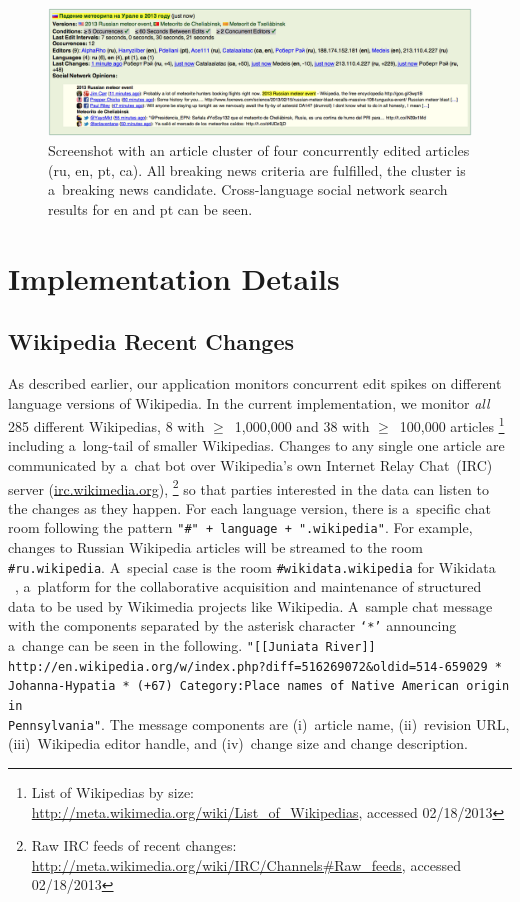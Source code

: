 \begin{figure}[!ht]
  \centering
  \includegraphics[width=\linewidth]{wikipedia-live-monitor.png}
  \caption[Screenshot with an article cluster of four concurrently edited articles]
    {Screenshot with an article cluster of four concurrently edited articles
    (ru, en, pt, ca). All breaking news criteria are fulfilled,
    the cluster is a~breaking news candidate.
    Cross-language social network search results for en and pt can be seen.}
  \label{fig:screenshotwikilivemon}
\end{figure}

\section{Implementation Details}

\subsection{Wikipedia Recent Changes}
\label{sec:wikipedia-recent-changes}

As described earlier, our application monitors concurrent edit spikes
on different language versions of Wikipedia.
In the current implementation, we monitor \emph{all}
285 different Wikipedias, 8 with 
$\geq$~1,000,000 and 38 with $\geq$~100,000 articles%
\footnote{List of Wikipedias by size: \url{http://meta.wikimedia.org/wiki/List_of_Wikipedias},
accessed 02/18/2013}
including a~long-tail of smaller Wikipedias.
Changes to any single one article are communicated by a~chat bot
over Wikipedia's own Internet Relay Chat~(IRC) server (\url{irc.wikimedia.org}),%
\footnote{Raw IRC feeds of recent changes: \url{http://meta.wikimedia.org/wiki/IRC/Channels\#Raw_feeds}, accessed 02/18/2013}
so that parties interested in the data can listen to the changes as they happen.
For each language version, there is a~specific chat room following the pattern
\texttt{"\#" + language + ".wikipedia"}.
For example, changes to Russian Wikipedia articles will be streamed to the room
\texttt{\#ru.wikipedia}.
A~special case is the room \texttt{\#wikidata.wikipedia} for Wikidata~%
~\cite{vrandecic2012wikidata},
a~platform for the collaborative acquisition and maintenance
of structured data to be used by
Wikimedia projects like Wikipedia.
A~sample chat message with the components separated
by the asterisk character \texttt{`*'}
announcing a~change can be seen in the following.
\texttt{"[[Juniata River]]
http://en.wikipedia.org/w/index.php?diff=516269072\&oldid=514-659029 *
Jo\-hanna-Hypatia * (+67)
Category:Place names of Native American origin in\\Pennsylvania"}.
The message components are (i)~article name, (ii)~revision URL,
(iii)~Wikipedia editor handle, and (iv)~change size and change description.

